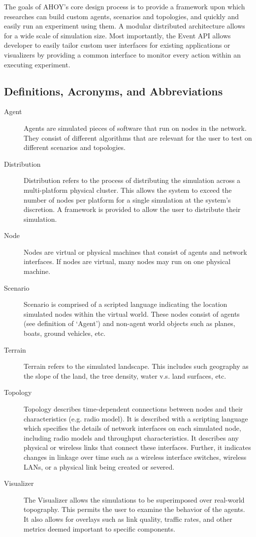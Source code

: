 \documentclass[titlepage]{article}
\begin{document}
The goals of AHOY's core design process is to provide a framework upon which researches can build custom agents, scenarios and topologies, and quickly and easily run an experiment using them. A modular distributed architecture allows for a wide scale of simulation size. Most importantly, the Event API allows developer to easily tailor custom user interfaces for existing applications or visualizers by providing a common interface to monitor every action within an executing experiment.

\subsection{Definitions, Acronyms, and Abbreviations}
\label{sec:glossary}
\begin{description}
\item[Agent]
	Agents are simulated pieces of software that run on nodes in the network. They consist of different algorithms that are relevant for the user to test on different scenarios and topologies.   

\item[Distribution]
	Distribution refers to the process of distributing the simulation across a multi-platform physical cluster.  This allows the system to exceed the number of nodes per platform for a single simulation at the system's discretion.  A framework is provided to allow the user to distribute their simulation. 	

\item[Node]
	Nodes are virtual or physical machines that consist of agents and network interfaces.  If nodes are virtual, many nodes may run on one physical machine.  

\item[Scenario]
	Scenario is comprised of a scripted language indicating the location simulated nodes within the virtual world. These nodes consist of agents (see definition of `Agent') and non-agent world objects such as planes, boats, ground vehicles, etc. 

\item[Terrain]
	Terrain refers to the simulated landscape.  This includes such geography as the slope of the land, the tree density, water v.s. land surfaces, etc.

\item[Topology]
	Topology describes time-dependent connections between nodes and their characteristics (e.g. radio model). It is described with a scripting language which specifies the details of network interfaces on each simulated node, including radio models and throughput characteristics.  It describes any physical or wireless links that connect these interfaces.  Further, it indicates changes in linkage over time such as a wireless interface switches, wireless LANs, or a physical link being created or severed. 

\item[Visualizer]
	The Visualizer allows the simulations to be superimposed over real-world topography.  This permits the user to examine the behavior of the agents.  It also allows for overlays such as link quality, traffic rates, and other metrics deemed important to specific components.
\end{description}
\end{document}
